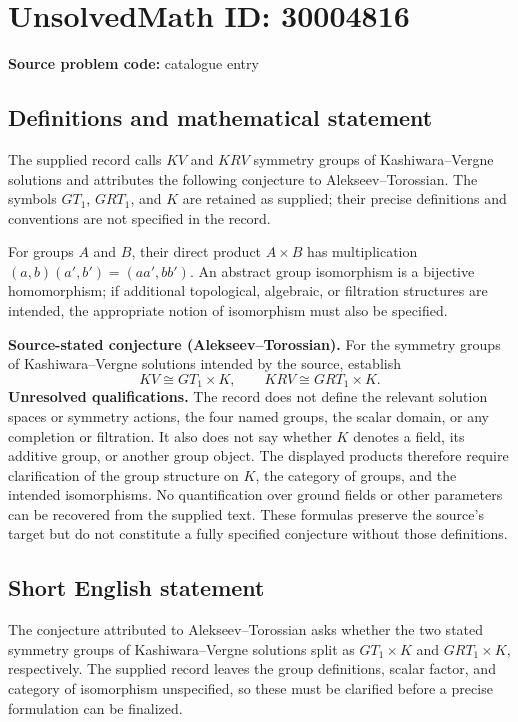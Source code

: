 \documentclass[11pt]{article}
\begin{document}
\section*{UnsolvedMath ID: 30004816}
\textbf{Source problem code:} catalogue entry
\subsection{Definitions and mathematical statement}
The supplied record calls \(KV\) and \(KRV\) symmetry groups of Kashiwara--Vergne solutions and attributes the following conjecture to Alekseev--Torossian. The symbols \(GT_1\), \(GRT_1\), and \(K\) are retained as supplied; their precise definitions and conventions are not specified in the record.

For groups \(A\) and \(B\), their direct product \(A\times B\) has multiplication \((a,b)(a',b')=(aa',bb')\). An abstract group isomorphism is a bijective homomorphism; if additional topological, algebraic, or filtration structures are intended, the appropriate notion of isomorphism must also be specified.

\textbf{Source-stated conjecture (Alekseev--Torossian).} For the symmetry groups of Kashiwara--Vergne solutions intended by the source, establish
\[
KV\cong GT_1\times K,
\qquad
KRV\cong GRT_1\times K.
\]
\textbf{Unresolved qualifications.} The record does not define the relevant solution spaces or symmetry actions, the four named groups, the scalar domain, or any completion or filtration. It also does not say whether \(K\) denotes a field, its additive group, or another group object. The displayed products therefore require clarification of the group structure on \(K\), the category of groups, and the intended isomorphisms. No quantification over ground fields or other parameters can be recovered from the supplied text. These formulas preserve the source's target but do not constitute a fully specified conjecture without those definitions.
\subsection{Short English statement}
The conjecture attributed to Alekseev--Torossian asks whether the two stated symmetry groups of Kashiwara--Vergne solutions split as \(GT_1\times K\) and \(GRT_1\times K\), respectively. The supplied record leaves the group definitions, scalar factor, and category of isomorphism unspecified, so these must be clarified before a precise formulation can be finalized.
\end{document}
